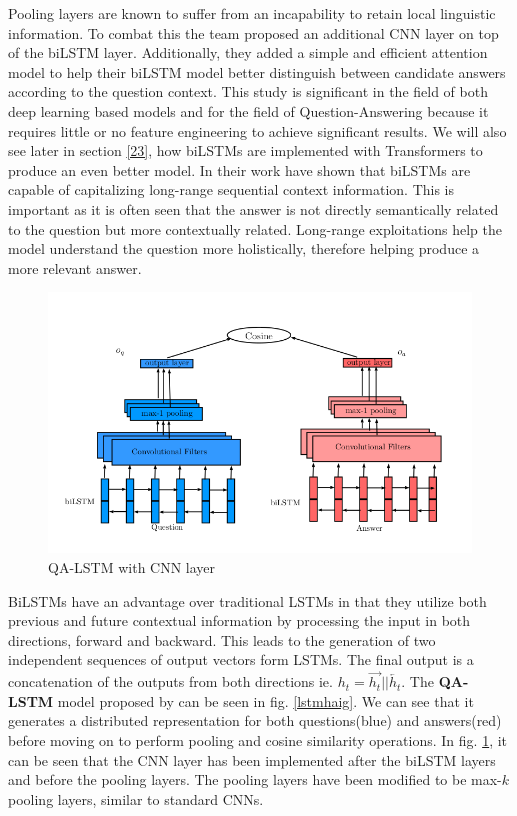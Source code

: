 \documentclass[a4paper,12pt]{report}
\begin{document}
            Pooling layers are known to suffer from an incapability to retain local linguistic information. To combat this the team proposed an additional CNN layer on top of the biLSTM layer. Additionally, they added a simple and efficient attention model to help their biLSTM model better distinguish between candidate answers according to the question context. This study is significant in the field of both deep learning based models and for the field of Question-Answering because it requires little or no feature engineering to achieve significant results. We will also see later in section \ref{23}, how biLSTMs are implemented with Transformers to produce an even better model.
            In their work \citep{lstmhaighextractive} have shown that biLSTMs are capable of capitalizing long-range sequential context information. This is important as it is often seen that the answer is not directly semantically related to the question but more contextually related. Long-range exploitations help the model understand the question more holistically, therefore helping produce a more relevant answer.


		   \begin{figure}
				\centering
				\includegraphics[scale=0.35]{../images/lstm-bilstmhaigcnn.png}
				\caption{QA-LSTM with CNN layer \citep{lstmhaighextractive}}\label{lstmhaigcnn}
			\end{figure}
		
             BiLSTMs have an advantage over traditional LSTMs in that they utilize both previous and future contextual information by processing the input in both directions, forward and backward. This leads to the generation of two independent sequences of output vectors form LSTMs. The final output is a concatenation  of the outputs from both directions ie. $h_t= \overrightarrow{h_t} || \overleftarrow{h_t} $.
             The \textbf{QA-LSTM} model  proposed by \citep{lstmhaighextractive} can be seen in fig. \ref{lstmhaig}. We can see that it generates a distributed representation for both questions(blue) and answers(red) before moving on to perform pooling and cosine similarity operations.
            In fig. \ref{lstmhaigcnn}, it can be seen that the CNN layer has been implemented after the biLSTM layers and before the pooling layers. The pooling layers have been modified to be max-$ k $ pooling layers, similar to standard CNNs.
         
\end{document}
